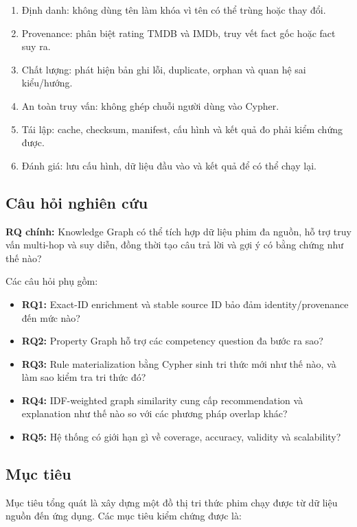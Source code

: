 \begin{enumerate}
\item Định danh: không dùng tên làm khóa vì tên có thể trùng hoặc thay đổi.
\item Provenance: phân biệt rating TMDB và IMDb, truy vết fact gốc hoặc fact suy ra.
\item Chất lượng: phát hiện bản ghi lỗi, duplicate, orphan và quan hệ sai kiểu/hướng.
\item An toàn truy vấn: không ghép chuỗi người dùng vào Cypher.
\item Tái lập: cache, checksum, manifest, cấu hình và kết quả đo phải kiểm chứng được.
\item Đánh giá: lưu cấu hình, dữ liệu đầu vào và kết quả để có thể chạy lại.
\end{enumerate}

\subsection{Câu hỏi nghiên cứu}

\textbf{RQ chính:} Knowledge Graph có thể tích hợp dữ liệu phim đa nguồn, hỗ trợ truy
vấn multi-hop và suy diễn, đồng thời tạo câu trả lời và gợi ý có bằng chứng như
thế nào?

Các câu hỏi phụ gồm:

\begin{itemize}
\item \textbf{RQ1:} Exact-ID enrichment và stable source ID bảo đảm identity/provenance đến mức nào?
\item \textbf{RQ2:} Property Graph hỗ trợ các competency question đa bước ra sao?
\item \textbf{RQ3:} Rule materialization bằng Cypher sinh tri thức mới như thế nào, và làm sao kiểm tra tri thức đó?
\item \textbf{RQ4:} IDF-weighted graph similarity cung cấp recommendation và explanation như thế nào so với các phương pháp overlap khác?
\item \textbf{RQ5:} Hệ thống có giới hạn gì về coverage, accuracy, validity và scalability?
\end{itemize}

\subsection{Mục tiêu}

Mục tiêu tổng quát là xây dựng một đồ thị tri thức phim chạy được từ dữ liệu
nguồn đến ứng dụng. Các mục tiêu kiểm chứng được là:

